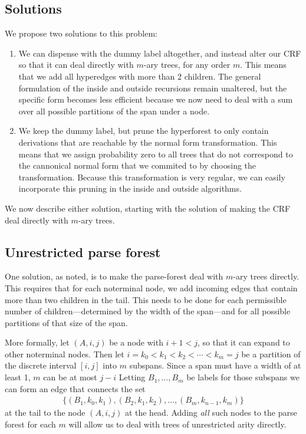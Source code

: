   \subsection{Solutions}
    We propose two solutions to this problem:
    \begin{enumerate}
      \item We can dispense with the dummy label altogether, and instead alter our CRF so that it can deal directly with $m$-ary trees, for any order $m$. This means that we add all hyperedges with more than 2 children. The general formulation of the inside and outside recursions remain unaltered, but the specific form becomes less efficient because we now need to deal with a sum over all possible partitions of the span under a node.
      \item We keep the dummy label, but prune the hyperforest to only contain derivations that are reachable by the normal form transformation. This means that we assign probability zero to all trees that do not correspond to the cannonical normal form that we commited to by choosing the transformation. Because this transformation is very regular, we can easily incorporate this pruning in the inside and outside algorithms.
    \end{enumerate}

    We now describe either solution, starting with the solution of making the CRF deal directly with $m$-ary trees.

  \subsection{Unrestricted parse forest}
    One solution, as noted, is to make the parse-forest deal with $m$-ary trees directly. This requires that for each noterminal node, we add incoming edges that contain more than two children in the tail. This needs to be done for each permissible number of children---determined by the width of the span---and for all possible partitions of that size of the span.

    More formally, let $(A,i,j)$ be a node with $i + 1 < j$, so that it can expand to other noterminal nodes. Then let $i = k_0 < k_1 < k_2 < \cdots < k_m = j$ be a partition of the discrete interval $[i, j]$ into $m$ subspans. Since a span must have a width of at least 1, $m$ can be at most $j-i$ Letting $B_1, \dots, B_m$ be labels for those subspans we can form an edge that connects the set
    \begin{align*}
      \Big\{ (B_1, k_0, k_1), (B_2, k_1, k_2), \dots, (B_m, k_{n-1}, k_m) \Big\}
    \end{align*}
    at the tail to the node $(A, i, j)$ at the head. Adding \textit{all} such nodes to the parse forest for each $m$ will allow us to deal with trees of unrestricted arity directly.


